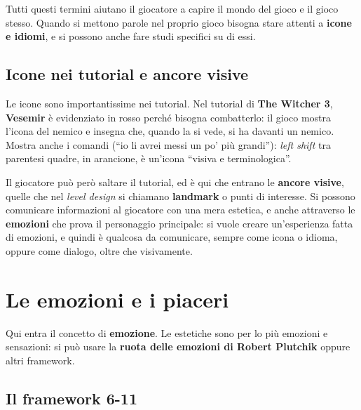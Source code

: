 Tutti questi termini aiutano il giocatore a capire il mondo del gioco e il gioco
stesso. Quando si mettono parole nel proprio gioco bisogna stare attenti a
\textbf{icone e idiomi}, e si possono anche fare studi specifici su di essi.

\subsection{Icone nei tutorial e ancore visive}

Le icone sono importantissime nei tutorial. Nel tutorial di \textbf{The Witcher
3}, \textbf{Vesemir} è evidenziato in rosso perché bisogna combatterlo: il gioco
mostra l'icona del nemico e insegna che, quando la si vede, si ha davanti un
nemico. Mostra anche i comandi (``io li avrei messi un po' più grandi''):
\emph{left shift} tra parentesi quadre, in arancione, è un'icona ``visiva e
terminologica''.

Il giocatore può però saltare il tutorial, ed è qui che entrano le
\textbf{ancore visive}, quelle che nel \emph{level design} si chiamano
\textbf{landmark} o punti di interesse. Si possono comunicare informazioni al
giocatore con una mera estetica, e anche attraverso le \textbf{emozioni} che prova
il personaggio principale: si vuole creare un'esperienza fatta di emozioni, e
quindi è qualcosa da comunicare, sempre come icona o idioma, oppure come dialogo,
oltre che visivamente.

\section{Le emozioni e i piaceri}
\label{sec:z6-emozioni}

Qui entra il concetto di \textbf{emozione}. Le estetiche sono per lo più emozioni
e sensazioni: si può usare la \textbf{ruota delle emozioni di Robert Plutchik}
oppure altri framework.

\subsection{Il framework 6-11}
\label{subsec:z6-6-11}

